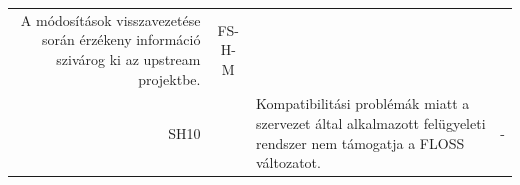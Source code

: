 \documentclass[12pt,magyar,a4paper,oneside]{scrreprt}
\begin{document}
\begin{longtable}[]{@{}rcll@{}}
\begin{minipage}[t]{0.69\columnwidth}
A módosítások visszavezetése során érzékeny információ szivárog ki az
upstream projektbe.\strut
\end{minipage} & \begin{minipage}[t]{0.13\columnwidth}\raggedright
FS-H-M\strut
\end{minipage}\tabularnewline
\begin{minipage}[t]{0.03\columnwidth}\raggedleft
SH10\strut
\end{minipage} & \begin{minipage}[t]{0.03\columnwidth}\centering
1\strut
\end{minipage} & \begin{minipage}[t]{0.69\columnwidth}\raggedright
Kompatibilitási problémák miatt a szervezet által alkalmazott
felügyeleti rendszer nem támogatja a FLOSS változatot.\strut
\end{minipage} & \begin{minipage}[t]{0.13\columnwidth}\raggedright
-\strut
\end{minipage}\tabularnewline
\bottomrule
\end{longtable}
\end{document}
